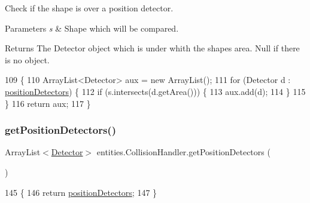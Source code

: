 Check if the shape is over a position detector.


\begin{DoxyParams}{Parameters}
{\em s} & Shape which will be compared. \\
\hline
\end{DoxyParams}
\begin{DoxyReturn}{Returns}
The Detector object which is under whith the shape\textquotesingle{}s area. Null if there is no object. 
\end{DoxyReturn}

\begin{DoxyCode}
109                                                              \{
110         ArrayList<Detector> aux = \textcolor{keyword}{new} ArrayList();
111         \textcolor{keywordflow}{for} (Detector d : \mbox{\hyperlink{classentities_1_1_collision_handler_ac8a71d4c1785179065bb3461aae87a1f}{positionDetectors}}) \{
112             \textcolor{keywordflow}{if} (s.intersects(d.getArea())) \{
113                 aux.add(d);
114             \}
115         \}
116         \textcolor{keywordflow}{return} aux;
117     \}
\end{DoxyCode}
\mbox{\label{classentities_1_1_collision_handler_aec69dac5dbf97182129420150b0b5624}} 
\subsubsection{\texorpdfstring{get\+Position\+Detectors()}{getPositionDetectors()}}
{\footnotesize\ttfamily Array\+List$<$\mbox{\hyperlink{interfacedetectors_1_1_detector}{Detector}}$>$ entities.\+Collision\+Handler.\+get\+Position\+Detectors (\begin{DoxyParamCaption}{ }\end{DoxyParamCaption})\hspace{0.3cm}{\ttfamily [inline]}}


\begin{DoxyCode}
145                                                       \{
146         \textcolor{keywordflow}{return} \mbox{\hyperlink{classentities_1_1_collision_handler_ac8a71d4c1785179065bb3461aae87a1f}{positionDetectors}};
147     \}
\end{DoxyCode}
\mbox{\label{classentities_1_1_collision_handler_a7bf0999c216ce86964042ad3e836686e}} 
